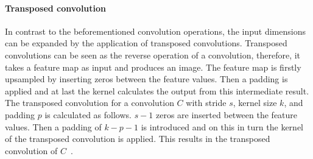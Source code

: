 \paragraph{Transposed convolution}
In contrast to the beforementioned convolution operations, the input dimensions can be expanded by the application of transposed convolutions.
Transposed convolutions can be seen as the reverse operation of a convolution, therefore, it takes a feature map as input and produces an image.
The feature map is firstly upsampled by inserting zeros between the feature values. 
Then a padding is applied and at last the kernel calculates the output from this intermediate result.
The transposed convolution for a convolution $C$ with stride $s$, kernel size $k$, and padding $p$ is calculated as follows.
$s - 1$ zeros are inserted between the feature values.
Then a padding of $k - p - 1$ is introduced and on this in turn the kernel of the transposed convolution is applied.
This results in the transposed convolution of $C$~\cite{Dumoulin2016}.

